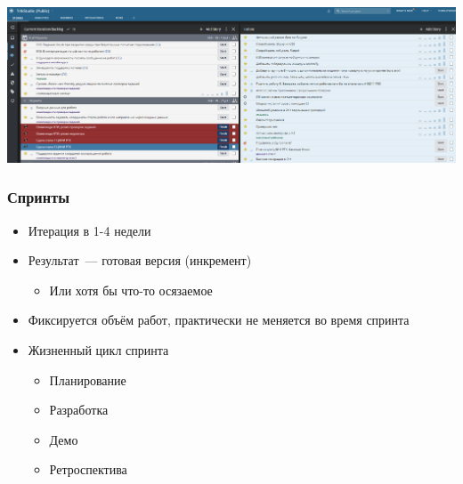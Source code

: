 \documentclass{../../slides-style}
\begin{document}
    \begin{frame}
        \begin{center}
            \includegraphics[width=\textwidth]{pivotalTracker.png}
        \end{center}
    \end{frame}

    \begin{frame}
        \frametitle{Спринты}
        \begin{itemize}
            \item Итерация в 1-4 недели
            \item Результат~--- готовая версия (инкремент)
            \begin{itemize}
                \item Или хотя бы что-то осязаемое
            \end{itemize}
            \item Фиксируется объём работ, практически не меняется во время
            спринта
            \item Жизненный цикл спринта
            \begin{itemize}
                \item Планирование
                \item Разработка
                \item Демо
                \item Ретроспектива
            \end{itemize}
        \end{itemize}
    \end{frame}
\end{document}
